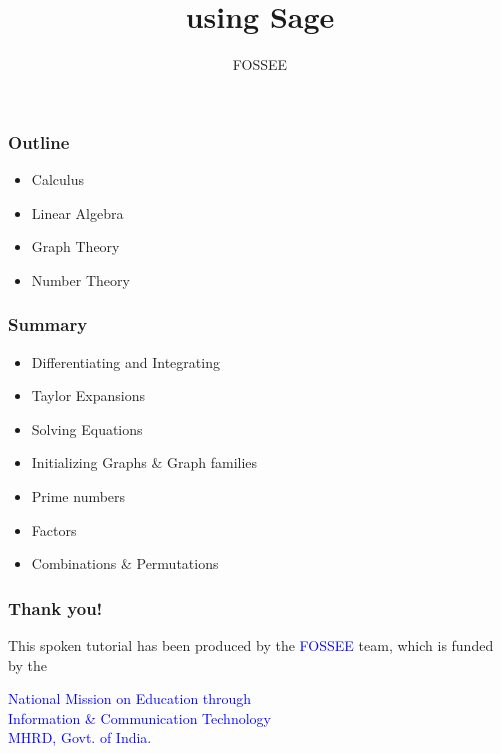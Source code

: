 \documentclass[presentation]{beamer}
\title{using Sage}
\author{FOSSEE}
\date{}
\begin{document}
\maketitle









\begin{frame}
\frametitle{Outline}
\label{sec-1}

\begin{itemize}
\item Calculus
\item Linear Algebra
\item Graph Theory
\item Number Theory
\end{itemize}
\end{frame}
\begin{frame}
\frametitle{Summary}
\label{sec-2}

\begin{itemize}
\item Differentiating and Integrating
\item Taylor Expansions
\item Solving Equations
\item Initializing Graphs \& Graph families
\item Prime numbers
\item Factors
\item Combinations \& Permutations
\end{itemize}
\end{frame}
\begin{frame}
\frametitle{Thank you!}
\label{sec-3}

  \begin{block}{}
  \begin{center}
  This spoken tutorial has been produced by the
  \textcolor{blue}{FOSSEE} team, which is funded by the 
  \end{center}
  \begin{center}
    \textcolor{blue}{National Mission on Education through \\
      Information \& Communication Technology \\ 
      MHRD, Govt. of India}.
  \end{center}  
  \end{block}
\end{frame}
\end{document}
